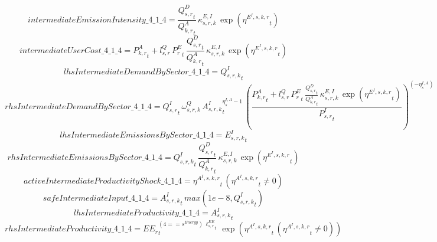 \begin{dmath*}
intermediateEmissionIntensity\_4\_1\_4 = \frac{{{Q^{D}_{s,r}}}_{t}}{{{Q^{A}_{k,r}}}_{t}}\, {{\kappa^{E,I}_{s,r,k}}}\, \exp\left({{\eta^{E^{I},s,k,r}}}_{t}\right)
\end{dmath*}
\begin{dmath*}
intermediateUserCost\_4\_1\_4 = {{P^{A}_{k,r}}}_{t}+{{l^{Q}_{s,r}}}\, {{P^E_r}}_{t}\, \frac{{{Q^{D}_{s,r}}}_{t}}{{{Q^{A}_{k,r}}}_{t}}\, {{\kappa^{E,I}_{s,r,k}}}\, \exp\left({{\eta^{E^{I},s,k,r}}}_{t}\right)
\end{dmath*}
\begin{dmath*}
lhsIntermediateDemandBySector\_4\_1\_4 = {{Q^{I}_{s,r,k}}}_{t}
\end{dmath*}
\begin{dmath*}
rhsIntermediateDemandBySector\_4\_1\_4 = {{Q^{I}_{s,r}}}_{t}\, {{\omega^{Q}_{s,r,k}}}\, {{A^{I}_{s,r,k}}}_{t}^{{{\eta^{I,A}_{s}}}-1}\, \left(\frac{{{P^{A}_{k,r}}}_{t}+{{l^{Q}_{s,r}}}\, {{P^E_r}}_{t}\, \frac{{{Q^{D}_{s,r}}}_{t}}{{{Q^{A}_{k,r}}}_{t}}\, {{\kappa^{E,I}_{s,r,k}}}\, \exp\left({{\eta^{E^{I},s,k,r}}}_{t}\right)}{{{P^{I}_{s,r}}}_{t}}\right)^{\left(-{{\eta^{I,A}_{s}}}\right)}
\end{dmath*}
\begin{dmath*}
lhsIntermediateEmissionsBySector\_4\_1\_4 = {{E^I_{s,r,k}}}_{t}
\end{dmath*}
\begin{dmath*}
rhsIntermediateEmissionsBySector\_4\_1\_4 = {{Q^{I}_{s,r,k}}}_{t}\, \frac{{{Q^{D}_{s,r}}}_{t}}{{{Q^{A}_{k,r}}}_{t}}\, {{\kappa^{E,I}_{s,r,k}}}\, \exp\left({{\eta^{E^{I},s,k,r}}}_{t}\right)
\end{dmath*}
\begin{dmath*}
activeIntermediateProductivityShock\_4\_1\_4 = {{\eta^{A^{I},s,k,r}}}_{t}\, \left({{\eta^{A^{I},s,k,r}}}_{t}\neq 0\right)
\end{dmath*}
\begin{dmath*}
safeIntermediateInput\_4\_1\_4 = {{A^{I}_{s,r,k}}}_{t}\, max(1e-8,{{Q^{I}_{s,r,k}}}_{t})
\end{dmath*}
\begin{dmath*}
lhsIntermediateProductivity\_4\_1\_4 = {{A^{I}_{s,r,k}}}_{t}
\end{dmath*}
\begin{dmath*}
rhsIntermediateProductivity\_4\_1\_4 = {{EE_r}}_{t}^{\left(4=={{s^{Energy}}}\right)\, {{\ell^{EE}_{s,r}}}_{t}}\, \exp\left({{\eta^{A^{I},s,k,r}}}_{t}\, \left({{\eta^{A^{I},s,k,r}}}_{t}\neq 0\right)\right)
\end{dmath*}
